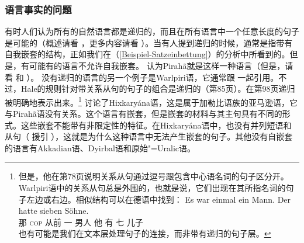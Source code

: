 \subsubsection{语言事实的问题}

有时人们认为所有的自然语言都是递归的，而且在所有语言中一个任意长度的句子是可能的（概述请看\citealp*[]{HNG2005a} ，更多内容请看 ）。当有人提到递归的时候，通常是指带有自我嵌套的结构，正如我们在（\ref{Beispiel-Satzeinbettung}）的分析\citep{Fitch2010a}中所看到的。但是，有可能有的语言不允许自我嵌套。 \citet{Everett2005a-u}认为Pirah{\~a}就是这样一种语言（但是，请看 和
 ）。
没有递归的语言的另一个例子是Warlpiri语，它通常跟 一起引用。不过，Hale的规则针对带关系从句的句子的组合是递归的（第85页）。在第98页递归被明确地表示出来。\footnote{%
但是，他在第78页说明关系从句通过逗号跟包含中心语名词的句子区分开。Warlpiri语中的关系从句总是外围的，也就是说，它们出现在其所指名词的句子左边或右边。相似结构可以在德语中找到：
\ea
\gll Es war einmal ein Mann. Der hatte sieben Söhne.\\
	 那 \textsc{cop}  从前 一 男人 他 有 七 儿子\\
\z
也有可能是我们在文本层处理句子的连接，而非带有递归的句子层。
} \citet[]{PS2010a}讨论了Hixkaryána语，这是属于加勒比语族的亚马逊语，它与Pirah{\~a}语没有关系。这个语言有嵌套，但是嵌套的材料与其主句具有不同的形式。这些嵌套不能带有非限定性的特征。在Hixkaryána语中，也没有并列短语和从句（ 援引 ），这就是为什么这种语言中无法产生嵌套的句子。其他没有自嵌套的语言有Akkadian语、Dyirbal语和原始"=Uralic语。
